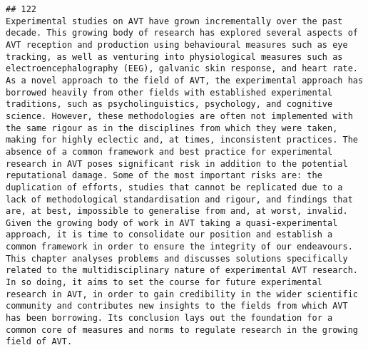 \documentclass[
  english,
  man]{apa6}
\begin{document}
\begin{verbatim}
## 122                                                                                                                                                                                                                                                                                                                                                                                                                                                                                                                                                                                                                                                                                                                                                              Experimental studies on AVT have grown incrementally over the past decade. This growing body of research has explored several aspects of AVT reception and production using behavioural measures such as eye tracking, as well as venturing into physiological measures such as electroencephalography (EEG), galvanic skin response, and heart rate. As a novel approach to the field of AVT, the experimental approach has borrowed heavily from other fields with established experimental traditions, such as psycholinguistics, psychology, and cognitive science. However, these methodologies are often not implemented with the same rigour as in the disciplines from which they were taken, making for highly eclectic and, at times, inconsistent practices. The absence of a common framework and best practice for experimental research in AVT poses significant risk in addition to the potential reputational damage. Some of the most important risks are: the duplication of efforts, studies that cannot be replicated due to a lack of methodological standardisation and rigour, and findings that are, at best, impossible to generalise from and, at worst, invalid. Given the growing body of work in AVT taking a quasi-experimental approach, it is time to consolidate our position and establish a common framework in order to ensure the integrity of our endeavours. This chapter analyses problems and discusses solutions specifically related to the multidisciplinary nature of experimental AVT research. In so doing, it aims to set the course for future experimental research in AVT, in order to gain credibility in the wider scientific community and contributes new insights to the fields from which AVT has been borrowing. Its conclusion lays out the foundation for a common core of measures and norms to regulate research in the growing field of AVT.

\end{verbatim}
\end{document}
